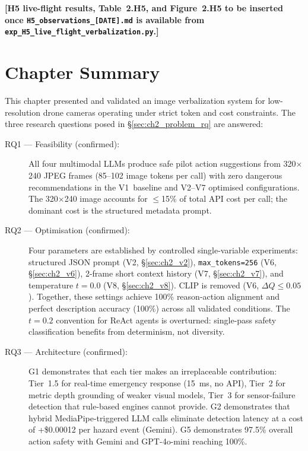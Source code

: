 \textbf{[H5 live-flight results, Table~2.H5, and Figure~2.H5 to be inserted
once \texttt{H5\_observations\_[DATE].md} is available from
\texttt{exp\_H5\_live\_flight\_verbalization.py}.]}


\section{Chapter Summary}
\label{sec:ch2_summary}

This chapter presented and validated an image verbalization system for
low-resolution drone cameras operating under strict token and cost constraints.
The three research questions posed in \S\ref{sec:ch2_problem_rq} are answered:

\begin{description}
  \item[RQ1 --- Feasibility (confirmed):]
    All four multimodal LLMs produce safe pilot action suggestions from
    320$\times$240 JPEG frames (85--102 image tokens per call) with zero
    dangerous recommendations in the V1~baseline and V2--V7 optimised
    configurations. The 320$\times$240 image accounts for $\leq$15\% of total
    API cost per call; the dominant cost is the structured metadata prompt.
  \item[RQ2 --- Optimisation (confirmed):]
    Four parameters are established by controlled single-variable experiments:
    structured JSON prompt (V2, \S\ref{sec:ch2_v2}), \texttt{max\_tokens=256}
    (V6, \S\ref{sec:ch2_v6}), 2-frame short context history (V7,
    \S\ref{sec:ch2_v7}), and temperature $t=0.0$ (V8, \S\ref{sec:ch2_v8}).
    CLIP is removed (V6, $\Delta Q \leq 0.05$). Together, these settings achieve
    100\% reason-action alignment and perfect description accuracy (100\%) across
    all validated conditions. The $t=0.2$ convention for ReAct agents is overturned:
    single-pass safety classification benefits from determinism, not diversity.
  \item[RQ3 --- Architecture (confirmed):]
    G1 demonstrates that each tier makes an irreplaceable contribution:
    Tier~1.5 for real-time emergency response (15~ms, no API), Tier~2 for metric
    depth grounding of weaker visual models, Tier~3 for sensor-failure detection
    that rule-based engines cannot provide. G2 demonstrates that hybrid
    MediaPipe-triggered LLM calls eliminate detection latency at a cost of
    +\$0.00012 per hazard event (Gemini). G5 demonstrates 97.5\% overall action
    safety with Gemini and GPT-4o-mini reaching 100\%.
\end{description}


